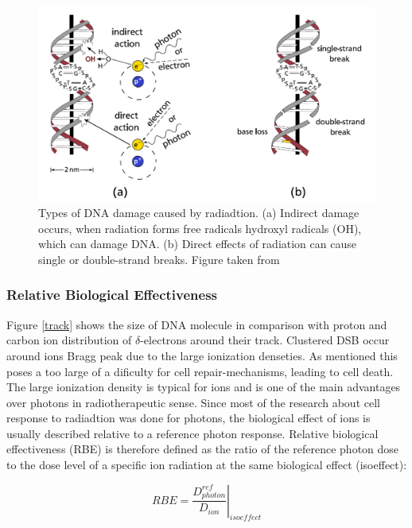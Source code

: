 \documentclass[type=dr, dr=rernat, accentcolor=tud7b,colorbacktitle, bigchapter, openright, twoside, 12pt ]{tudthesis}
\begin{document}
\begin{figure}[H]
\begin{center}
\includegraphics[scale=0.5]{./Images/SSB_DSB.png}
\caption{Types of DNA damage caused by radiadtion. (a) Indirect damage occurs, when radiation forms free radicals hydroxyl radicals (OH), which can damage DNA. (b) Direct effects of radiation can cause single or double-strand breaks. 
Figure taken from \cite{Richter2012}}
\label{ida}
\end{center}
\end{figure}


\subsubsection{Relative Biological Effectiveness}
\label{RBE}

Figure \ref{track} shows the size of DNA molecule in comparison with proton and carbon ion distribution of $\delta$-electrons around their track. Clustered DSB occur around ions Bragg peak due to the large ionization denseties. As mentioned
this poses a too large of a dificulty for cell repair-mechanisms, leading to cell death. The large ionization density is typical for ions and is one of the main advantages over photons in radiotherapeutic sense. Since most of the research about
cell response to radiadtion was done for photons, the biological effect of ions is usually described relative to a reference photon response. Relative biological effectiveness (RBE) is therefore defined as the ratio of the reference 
photon dose to the dose level of a specific ion radiation at the same biological effect (isoeffect):

\begin{equation}
 RBE = \left.\frac{D^{ref}_{photon}}{D_{ion}} \right|_{isoeffect}
\end{equation}
\end{document}
